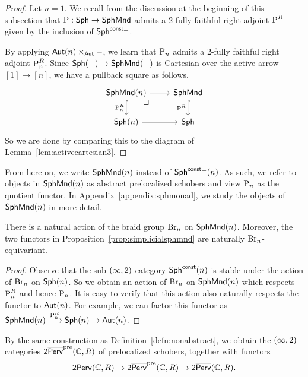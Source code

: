 \begin{proof}
    Let $n=1$. We recall from the discussion at the beginning of this subsection that $\operatorname{P}:\mathsf{Sph}\to\mathsf{SphMnd}$ admits a 2-fully faithful right adjoint $\operatorname{P}^R$ given by the inclusion of $\mathsf{Sph}^{\mathsf{const}\perp}$.

    By applying $\mathsf{Aut}(n)\times_{\mathsf{Aut}}-$, we learn that $\operatorname{P}_n$ admits a 2-fully faithful right adjoint $\operatorname{P}_n^R$. Since $\mathsf{Sph}(-)\to \mathsf{SphMnd}(-)$ is Cartesian over the active arrow $[1]\to [n]$, we have a pullback square as follows.
    \[\begin{tikzcd}[ampersand replacement=\&]
        {\sfSphMnd(n)}\pullback \& \sfSphMnd \\
        {\sfSph(n)} \& \sfSph
        \arrow[from=1-1, to=1-2]
        \arrow["{\opname{P}_n^R}"', hook, from=1-1, to=2-1]
        \arrow["{\opname{P}^R}"', hook, from=1-2, to=2-2]
        \arrow[from=2-1, to=2-2]
    \end{tikzcd}\]
    So we are done by comparing this to the diagram of Lemma~\ref{lem:activecartesian3}.
\end{proof}

From here on, we write $\mathsf{SphMnd}(n)$ instead of $\mathsf{Sph}^{\mathsf{const}\perp}(n)$. As such, we refer to objects in $\mathsf{SphMnd}(n)$ as abstract prelocalized schobers and view $\operatorname{P}_n$ as the quotient functor. In Appendix~\ref{appendix:sphmonad}, we study the objects of $\mathsf{SphMnd}(n)$ in more detail.

\begin{cor}\label{cor:action3}
    There is a natural action of the braid group $\operatorname{Br}_n$ on $\mathsf{SphMnd}(n)$. Moreover, the two functors in Proposition~\ref{prop:simplicialsphmnd} are naturally $\operatorname{Br}_n$-equivariant.
\end{cor}

\begin{proof}
    Observe that the sub-$(\infty,2)$-category $\mathsf{Sph}^{\mathsf{const}}(n)$ is stable under the action of $\operatorname{Br}_n$ on $\mathsf{Sph}(n)$. So we obtain an action of $\operatorname{Br}_n$ on $\mathsf{SphMnd}(n)$ which respects $\operatorname{P}_n^R$ and hence $\operatorname{P}_n$. It is easy to verify that this action also naturally respects the functor to $\mathsf{Aut}(n)$. For example, we can factor this functor as $\mathsf{SphMnd}(n)\xrightarrow{\operatorname{P}_n^R}\mathsf{Sph}(n)\to \mathsf{Aut}(n)$.
\end{proof}

By the same construction as Definition~\ref{defn:nonabstract}, we obtain the $(\infty,2)$-categories $\mathsf{2}\overline{\mathsf{Perv}}^{\operatorname{pre}}(\mathbb{C},R)$ of prelocalized schobers, together with functors
\[\mathsf{2Perv}(\mathbb{C},R)\to \mathsf{2}\overline{\mathsf{Perv}}^{\operatorname{pre}}(\mathbb{C},R)\to \mathsf{2}\overline{\mathsf{Perv}}(\mathbb{C},R).\]